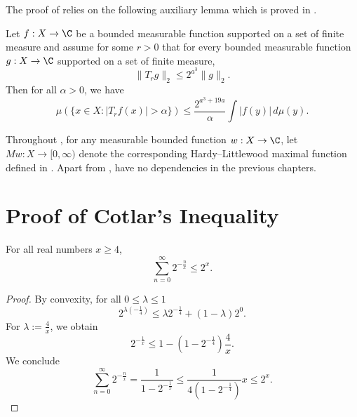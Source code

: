 The proof of  relies on the following auxiliary lemma which is proved in .
\begin{lemma}[Weak 1 1]
    \label{weak-1-1}
    Let $f:X\to\C$ be a bounded measurable function supported on a set of finite measure and assume for some $r>0$ that for every bounded measurable function $g:X\to\C$ supported on a set of finite measure,
    \begin{equation}
        \label{eq-strong-2-2-assumption}
        \|T_rg\|_{2}\le 2^{a^3} \|g\|_2.
    \end{equation}
    Then for all $\alpha>0$, we have
    \begin{equation}
        \label{eq-weak-1-1}
        \mu\left(\{x\in X: |T_r f(x)|>\alpha\}\right)\le \frac{2^{a^3 + 19a}}{\alpha} \int |f(y)|\, d\mu(y).
    \end{equation}
\end{lemma}
Throughout , for any measurable bounded function $w: X \to \C$, let $Mw: X \to [0, \infty)$ denote the corresponding Hardy--Littlewood maximal function defined in .
Apart from ,  have no dependencies in the previous chapters.



\section{Proof of Cotlar's Inequality}
\label{subsec-cotlar}

\begin{lemma}
    \label{geometric-series-estimate}
    For all real numbers $x\ge 4$,
    \begin{equation*}
        \sum_{n=0}^\infty 2^{-\frac{n}{x}} \le 2^x.
    \end{equation*}
\end{lemma}
\begin{proof}
    By convexity, for all $0\le\lambda\le1$
    \begin{equation*}
        2^{\lambda(-\frac{1}{4})} \le \lambda 2^{-\frac{1}{4}} + (1-\lambda)2^0.
    \end{equation*}
    For $\lambda:=\frac{4}{x}$, we obtain
    \begin{equation*}
        2^{-\frac 1 x} \le 1 - (1-2^{-\frac 1 4}) \frac{4}{x}.
    \end{equation*}
    We conclude
    \begin{equation*}
        \sum_{n=0}^\infty 2^{-\frac{n}{x}} = \frac{1}{1-2^{-\frac 1 x}} \le \frac{1}{4(1-2^{-\frac 1 4})} x \le 2^x.
    \end{equation*}
\end{proof}

